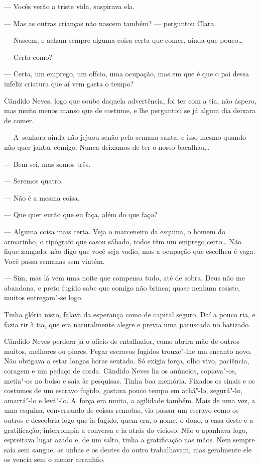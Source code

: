 \begin{linenumbers}
--- Vocês verão a triste vida, suspirava ela.

--- Mas as outras crianças não nascem também? --- perguntou Clara.

--- Nascem, e acham sempre alguma coisa certa que comer, ainda que
pouco\ldots{}

--- Certa como?

--- Certa, um emprego, um ofício, uma ocupação, mas em que é que o pai
dessa infeliz criatura que aí vem gasta o tempo?

Cândido Neves, logo que soube daquela advertência, foi ter com a tia,
não áspero, mas muito menos manso que de costume, e lhe perguntou se já
algum dia deixara de comer.

--- A~senhora ainda não jejuou senão pela semana santa, e isso mesmo
quando não quer jantar comigo. Nunca deixamos de ter o nosso bacalhau\ldots{}

--- Bem sei, mas somos três.

--- Seremos quatro.

--- Não é a mesma coisa.

--- Que quer então que eu faça, além do que faço?

--- Alguma coisa mais certa. Veja o marceneiro da esquina, o homem do
armarinho, o tipógrafo que casou sábado, todos têm um emprego certo\ldots{}
Não fique zangado; não digo que você seja vadio, mas a ocupação que
escolheu é vaga. Você passa semanas sem vintém.

--- Sim, mas lá vem uma noite que compensa tudo, até de sobra. Deus não
me abandona, e preto fugido sabe que comigo não brinca; quase nenhum
resiste, muitos entregam"-se logo.

Tinha glória nisto, falava da esperança como de capital seguro. Daí a
pouco ria, e fazia rir à tia, que era naturalmente alegre e previa uma
patuscada no batizado.

Cândido Neves perdera já o ofício de entalhador, como abrira mão de
outros muitos, melhores ou piores. Pegar escravos fugidos trouxe"-lhe um
encanto novo. Não obrigava a estar longas horas sentado. Só exigia
força, olho vivo, paciência, coragem e um pedaço de corda. Cândido Neves
lia os anúncios, copiava"-os, metia"-os no bolso e saía às pesquisas.
Tinha boa memória. Fixados os sinais e os costumes de um escravo fugido,
gastava pouco tempo em achá"-lo, segurá"-lo, amarrá"-lo e levá"-lo. A~força
era muita, a agilidade também. Mais de uma vez, a uma esquina,
conversando de coisas remotas, via passar um escravo como os outros e
descobria logo que ia fugido, quem era, o nome, o dono, a casa deste e a
gratificação; interrompia a conversa e ia atrás do vicioso. Não o
apanhava logo, espreitava lugar azado e, de um salto, tinha a
gratificação nas mãos. Nem sempre saía sem sangue, as unhas e os dentes
do outro trabalhavam, mas geralmente ele os vencia sem o menor arranhão.


\end{linenumbers}
